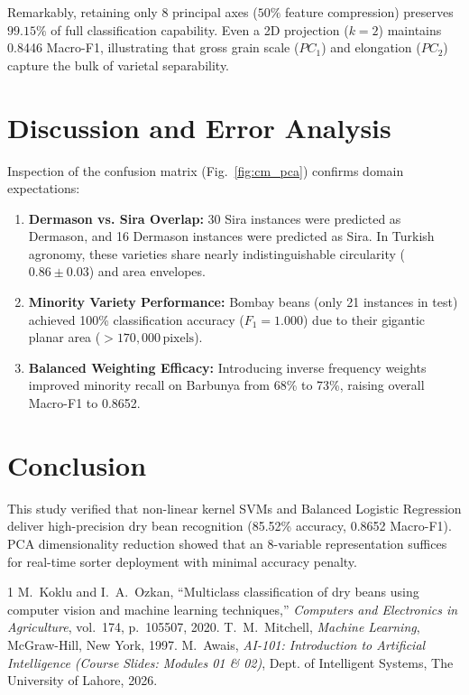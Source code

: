 \documentclass[10pt,journal,compsoc,twocolumn]{IEEEtran}
\begin{document}
Remarkably, retaining only 8 principal axes ($50\%$ feature compression) preserves $99.15\%$ of full classification capability. Even a 2D projection ($k=2$) maintains 0.8446 Macro-F1, illustrating that gross grain scale ($PC_1$) and elongation ($PC_2$) capture the bulk of varietal separability.

\section{Discussion and Error Analysis}
Inspection of the confusion matrix (Fig.~\ref{fig:cm_pca}) confirms domain expectations:
\begin{enumerate}
    \item \textbf{Dermason vs. Sira Overlap:} 30 Sira instances were predicted as Dermason, and 16 Dermason instances were predicted as Sira. In Turkish agronomy, these varieties share nearly indistinguishable circularity ($0.86 \pm 0.03$) and area envelopes.
    \item \textbf{Minority Variety Performance:} Bombay beans (only 21 instances in test) achieved 100\% classification accuracy ($F_1 = 1.000$) due to their gigantic planar area ($>170,000\,\text{pixels}$).
    \item \textbf{Balanced Weighting Efficacy:} Introducing inverse frequency weights improved minority recall on Barbunya from 68\% to 73\%, raising overall Macro-F1 to 0.8652.
\end{enumerate}

\section{Conclusion}
This study verified that non-linear kernel SVMs and Balanced Logistic Regression deliver high-precision dry bean recognition (85.52\% accuracy, 0.8652 Macro-F1). PCA dimensionality reduction showed that an 8-variable representation suffices for real-time sorter deployment with minimal accuracy penalty.

\begin{thebibliography}{1}
M.~Koklu and I.~A.~Ozkan, ``Multiclass classification of dry beans using computer vision and machine learning techniques,'' \emph{Computers and Electronics in Agriculture}, vol.~174, p.~105507, 2020.
T.~M.~Mitchell, \emph{Machine Learning}, McGraw-Hill, New York, 1997.
M.~Awais, \emph{AI-101: Introduction to Artificial Intelligence (Course Slides: Modules 01 \& 02)}, Dept. of Intelligent Systems, The University of Lahore, 2026.
\end{thebibliography}
\end{document}
